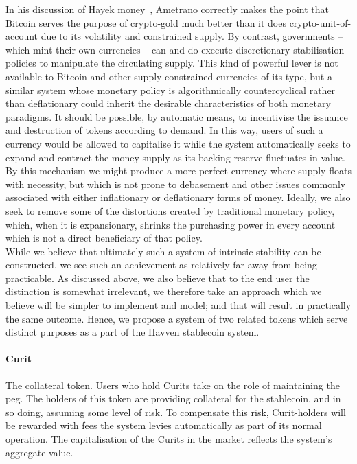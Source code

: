 \noindent  In his discussion of Hayek money~\cite{ametrano2016hayek}, Ametrano correctly makes the point that Bitcoin serves the purpose of crypto-gold much better than it does crypto-unit-of-account due to its volatility and constrained supply. By contrast, governments -- which mint their own currencies -- can and do execute discretionary stabilisation policies to manipulate the circulating supply. This kind of powerful lever is not available to Bitcoin and other supply-constrained currencies of its type, but a similar system whose monetary policy is algorithmically countercyclical rather than deflationary could inherit the desirable characteristics of both monetary paradigms. It should be possible, by automatic means, to incentivise the issuance and destruction of tokens according to demand. In this way, users of such a currency would be allowed to capitalise it while the system automatically seeks to expand and contract the money supply as its backing reserve fluctuates in value. By this mechanism we might produce a more perfect currency where supply floats with necessity, but which is not prone to debasement and other issues commonly associated with either inflationary or deflationary forms of money. Ideally, we also seek to remove some of the distortions created by traditional monetary policy, which, when it is expansionary, shrinks the purchasing power in every account which is not a direct beneficiary of that policy.\\

\noindent While we believe that ultimately such a system of intrinsic stability can be constructed, we see such an achievement as relatively far away from being practicable. As discussed above, we also believe that to the end user the distinction is somewhat irrelevant, we therefore take an approach which we believe will be simpler to implement and model; and that will result in practically the same outcome. Hence, we propose a system of two related tokens which serve distinct purposes as a part of the Havven stablecoin system.

\paragraph{Curit} The collateral token. Users who hold Curits take on the role of maintaining the peg. The holders of this token are providing collateral for the stablecoin, and in so doing, assuming some level of risk. To compensate this risk, Curit-holders will be rewarded with fees the system levies automatically as part of its normal operation. The capitalisation of the Curits in the market reflects the system's aggregate value.

